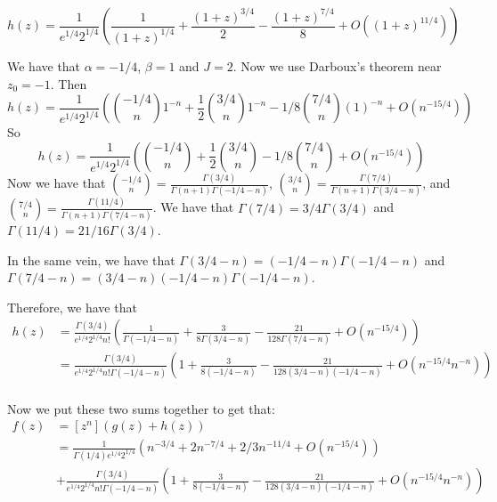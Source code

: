 \documentclass[]{article}
\begin{document}
\begin{equation}
	h(z) = \frac{1}{e^{1/4} 2^{1/4}} \left(\frac{1}{(1 + z)^{1/4}} + \frac{(1 + z)^{3/4}}{2} - \frac{(1 + z)^{7/4}}{8} +  O((1 + z)^{11/4})\right)
\end{equation}

We have that $\alpha = -1/4$, $\beta = 1$ and $J = 2$. 
Now we use Darboux's theorem near $z_0 = -1$. Then 
\begin{equation}
	[z^n] h(z) = \frac{1}{e^{1/4} 2^{1/4}} \left(\binom{-1/4}{n} 1^{-n}+ \frac{1}{2} \binom{3/4}{n} 1^{-n} - 1/8 \binom{7/4}{n} (1)^{-n }+  O(n^{-15/4})\right)
\end{equation}
So 
\begin{equation}
	[z^n] h(z) = \frac{1}{e^{1/4} 2^{1/4}} \left(\binom{-1/4}{n} + \frac{1}{2} \binom{3/4}{n} - 1/8 \binom{7/4}{n}+  O(n^{-15/4})\right)
\end{equation}
Now we have that $\binom{-1/4}{n} = \frac{\Gamma(3/4)}{\Gamma(n + 1) \Gamma(-1/4 - n)}$, $\binom{3/4}{n} = \frac{\Gamma(7/4)}{\Gamma(n + 1) \Gamma(3/4 - n)}$, and $\binom{7/4}{n} = \frac{\Gamma(11/4)}{\Gamma(n + 1) \Gamma(7/4 - n)}$. We have that $\Gamma(7/4) = 3/4 \Gamma(3/4)$ and $\Gamma(11/4) = 21/16 \Gamma(3/4)$. 

In the same vein, we have that $\Gamma(3/4 - n) = (-1/4 - n)\Gamma(-1/4 - n)$ and $\Gamma(7/4 - n) = (3/4 - n)(-1/4 - n) \Gamma(-1/4 - n)$. 

Therefore, we have that
\begin{align*}
	[z^n] h(z) &= \frac{\Gamma(3/4)}{e^{1/4} 2^{1/4} n!} \left(\frac{1}{\Gamma(-1/4 - n)}+ \frac{3}{8 \Gamma(3/4 - n)} - \frac{21}{128 \Gamma(7/4 - n)}+  O(n^{-15/4})\right)\\
	&= 
	\frac{\Gamma(3/4)}{e^{1/4} 2^{1/4} n! \Gamma(-1/4 - n)} \left(1+ \frac{3}{8 (-1/4 - n)} - \frac{21}{128 (3/4 - n)(-1/4 - n)}+  O(n^{-15/4} n^{-n})\right)\\
\end{align*}

Now we put these two sums together to get that:
\begin{align*}
	[z^n] f(z) &= [z^n] \left(g(z) + h(z)\right)\\
	&=
	\frac{1}{\Gamma(1/4) e^{1/4} 2^{1/4} }\left( n^{-3/4} +  2 n^{-7/4} + 2/3 n^{-11/4} + O(n^{-15/4}) \right)\\ 
	&+
	\frac{\Gamma(3/4)}{e^{1/4} 2^{1/4} n! \Gamma(-1/4 - n)} \left(1+ \frac{3}{8 (-1/4 - n)} - \frac{21}{128 (3/4 - n)(-1/4 - n)}+  O(n^{-15/4} n^{-n})\right)
\end{align*}
\end{document}
